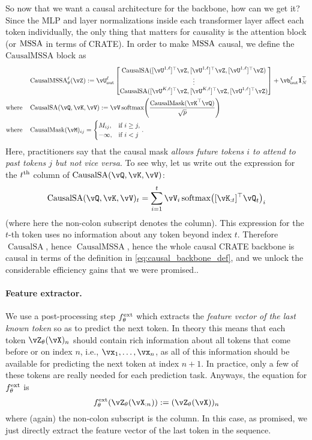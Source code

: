 \documentclass[\toplevelprefix/book-main.tex]{subfiles}
\begin{document}
So now that we want a causal architecture for the backbone, how can we get it? Since the MLP and layer normalizations inside each transformer layer affect each token individually, the only thing that matters for causality is the attention block (or \(\operatorname{MSSA}\) in terms of CRATE). In order to make \(\operatorname{MSSA}\) causal, we define the \(\mathrm{CausalMSSA}\) block as 
\begin{align}
    &\operatorname{CausalMSSA}_{\theta}^{\ell}(\vZ) := \vU_{\out}^{\ell}\mat{\operatorname{CausalSA}([\vU^{1, \ell}]^{\top}\vZ, [\vU^{1, \ell}]^{\top}\vZ, [\vU^{1, \ell}]^{\top}\vZ) \\ \vdots \\ \operatorname{CausalSA}([\vU^{K, \ell}]^{\top}\vZ, [\vU^{K, \ell}]^{\top}\vZ, [\vU^{1, \ell}]^{\top}\vZ)} + \vb_{\out}^{\ell}\vone_{N}^{\top} \\ 
    \text{where} \quad & \operatorname{CausalSA}(\vQ, \vK, \vV) := \vV\softmax\rp{\frac{\operatorname{CausalMask}(\vK^{\top}\vQ)}{\sqrt{p}}} \\ 
    \text{where} \quad & \operatorname{CausalMask}(\vM)_{ij} = \casework{M_{ij}, & \text{if}\ i \geq j, \\ -\infty, & \text{if}\ i < j}.
\end{align}
Here, practitioners say that the causal mask \textit{allows future tokens \(i\) to attend to past tokens \(j\) but not vice versa}. To see why, let us write out the expression for the \(t^{\textnormal{th}}\) column of \(\operatorname{CausalSA}(\vQ, \vK, \vV)\):
\begin{equation}
    \operatorname{CausalSA}(\vQ, \vK, \vV)_{t} = \sum_{i = 1}^{t}\vV_{i}\softmax\rp{[\vK_{:t}]^{\top}\vQ_{t}}_{i}
\end{equation}
(where here the non-colon subscript denotes the column). This expression for the \(t\)-th token uses no information about any token beyond index \(t\). Therefore \(\operatorname{CausalSA}\), hence \(\operatorname{CausalMSSA}\), hence the whole causal CRATE backbone is causal in terms of the definition in \eqref{eq:causal_backbone_def}, and we unlock the considerable efficiency gains that we were promised.. 

\paragraph{Feature extractor.} We use a post-processing step \(f_{\theta}^{\mathrm{ext}}\) which extracts the \textit{feature vector of the last known token} so as to predict the next token. In theory this means that each token \(\vZ_{\theta}(\vX)_{n}\) should contain rich information about all tokens that come before or on index \(n\), i.e., \(\vx_{1}, \dots, \vx_{n}\), as all of this information should be available for predicting the next token at index \(n + 1\). In practice, only a few of these tokens are really needed for each prediction task. Anyways, the equation for \(f_{\theta}^{\mathrm{ext}}\) is 
\begin{equation}
    f_{\theta}^{\ext}(\vZ_{\theta}(\vX_{:n})) := (\vZ_{\theta}(\vX))_{n}
\end{equation}
where (again) the non-colon subscript is the column. In this case, as promised, we just directly extract the feature vector of the last token in the sequence.
\end{document}
